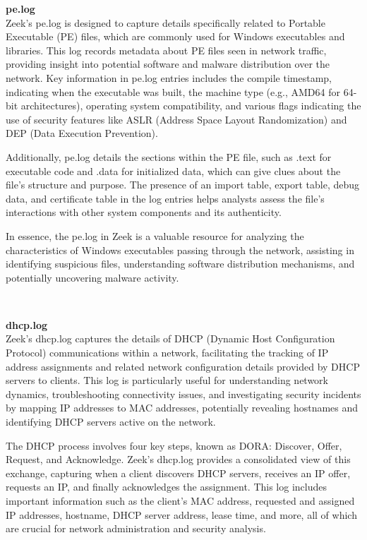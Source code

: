 \noindent \Large \textbf{pe.log}
\vspace{5pt}
\\
\normalsize
Zeek's \colorbox{gray!20}{pe.log} is designed to capture details specifically related to Portable Executable (PE) files, which are commonly used for Windows executables and libraries. This log records metadata about PE files seen in network traffic, providing insight into potential software and malware distribution over the network. Key information in \colorbox{gray!20}{pe.log} entries includes the compile timestamp, indicating when the executable was built, the machine type (e.g., AMD64 for 64-bit architectures), operating system compatibility, and various flags indicating the use of security features like ASLR (Address Space Layout Randomization) and DEP (Data Execution Prevention).

Additionally, \colorbox{gray!20}{pe.log} details the sections within the PE file, such as .text for executable code and .data for initialized data, which can give clues about the file's structure and purpose. The presence of an import table, export table, debug data, and certificate table in the log entries helps analysts assess the file's interactions with other system components and its authenticity.

In essence, the \colorbox{gray!20}{pe.log} in Zeek is a valuable resource for analyzing the characteristics of Windows executables passing through the network, assisting in identifying suspicious files, understanding software distribution mechanisms, and potentially uncovering malware activity.

\\
\vspace{1cm}



\noindent \Large \textbf{dhcp.log}
\vspace{5pt}
\\
\normalsize
Zeek's \colorbox{gray!20}{dhcp.log} captures the details of DHCP (Dynamic Host Configuration Protocol) communications within a network, facilitating the tracking of IP address assignments and related network configuration details provided by DHCP servers to clients. This log is particularly useful for understanding network dynamics, troubleshooting connectivity issues, and investigating security incidents by mapping IP addresses to MAC addresses, potentially revealing hostnames and identifying DHCP servers active on the network.

The DHCP process involves four key steps, known as DORA: Discover, Offer, Request, and Acknowledge. Zeek's \colorbox{gray!20}{dhcp.log} provides a consolidated view of this exchange, capturing when a client discovers DHCP servers, receives an IP offer, requests an IP, and finally acknowledges the assignment. This log includes important information such as the client's MAC address, requested and assigned IP addresses, hostname, DHCP server address, lease time, and more, all of which are crucial for network administration and security analysis.

